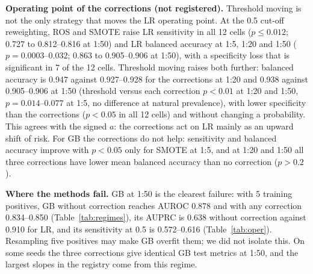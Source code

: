 \textbf{Operating point of the corrections (not registered).} Threshold moving is not the only strategy that moves the LR operating point. At the 0.5 cut-off reweighting, ROS and SMOTE raise LR sensitivity in all 12 cells ($p\le0.012$; 0.727 to 0.812--0.816 at 1:50) and LR balanced accuracy at 1:5, 1:20 and 1:50 ($p=0.0003$--$0.032$; 0.863 to 0.905--0.906 at 1:50), with a specificity loss that is significant in 7 of the 12 cells. Threshold moving raises both further: balanced accuracy is 0.947 against 0.927--0.928 for the corrections at 1:20 and 0.938 against 0.905--0.906 at 1:50 (threshold versus each correction $p<0.01$ at 1:20 and 1:50, $p=0.014$--$0.077$ at 1:5, no difference at natural prevalence), with lower specificity than the corrections ($p<0.05$ in all 12 cells) and without changing a probability. This agrees with the signed $a$: the corrections act on LR mainly as an upward shift of risk. For GB the corrections do not help: sensitivity and balanced accuracy improve with $p<0.05$ only for SMOTE at 1:5, and at 1:20 and 1:50 all three corrections have lower mean balanced accuracy than no correction ($p>0.2$).

\begin{table}[t]\centering\caption{Operating point at each system's cut-off (0.5; training prevalence for threshold moving), mean of 10 seeds. $^{*}$: unadjusted paired $p<0.05$ against no correction, same learner.}\label{tab:oper}
\small
\end{table}

\textbf{Where the methods fail.} GB at 1:50 is the clearest failure: with 5 training positives, GB without correction reaches AUROC 0.878 and with any correction 0.834--0.850 (Table~\ref{tab:regimes}), its AUPRC is 0.638 without correction against 0.910 for LR, and its sensitivity at 0.5 is 0.572--0.616 (Table~\ref{tab:oper}). Resampling five positives may make GB overfit them; we did not isolate this. On some seeds the three corrections give identical GB test metrics at 1:50, and the largest slopes in the registry come from this regime.
